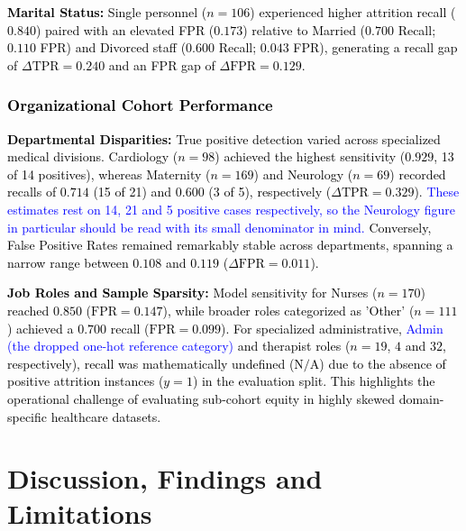 \documentclass[a4paper,fleqn]{cas-sc}
\begin{document}
\textcolor{black}{\textbf{Marital Status:} Single personnel ($n = 106$) experienced higher attrition recall ($0.840$) paired with an elevated FPR ($0.173$) relative to Married ($0.700$ Recall; $0.110$ FPR) and Divorced staff ($0.600$ Recall; $0.043$ FPR), generating a recall gap of $\Delta\text{TPR} = 0.240$ and an FPR gap of $\Delta\text{FPR} = 0.129$.}

\subsubsection*{\textcolor{black}{Organizational Cohort Performance}}
\textcolor{black}{\textbf{Departmental Disparities:} True positive detection varied across specialized medical divisions. Cardiology ($n = 98$) achieved the highest sensitivity ($0.929$, 13 of 14 positives), whereas Maternity ($n = 169$) and Neurology ($n = 69$) recorded recalls of $0.714$ (15 of 21) and $0.600$ (3 of 5), respectively ($\Delta\text{TPR} = 0.329$). \textcolor{blue}{These estimates rest on 14, 21 and 5 positive cases respectively, so the Neurology figure in particular should be read with its small denominator in mind.} Conversely, False Positive Rates remained remarkably stable across departments, spanning a narrow range between $0.108$ and $0.119$ ($\Delta\text{FPR} = 0.011$).}

\textcolor{black}{\textbf{Job Roles and Sample Sparsity:} Model sensitivity for Nurses ($n = 170$) reached $0.850$ ($\text{FPR} = 0.147$), while broader roles categorized as 'Other' ($n = 111$) achieved a $0.700$ recall ($\text{FPR} = 0.099$). For specialized administrative, \textcolor{blue}{Admin (the dropped one-hot reference category)} and therapist roles ($n = 19$, $4$ and $32$, respectively), recall was mathematically undefined ($\text{N/A}$) due to the absence of positive attrition instances ($y = 1$) in the evaluation split. This highlights the operational challenge of evaluating sub-cohort equity in highly skewed domain-specific healthcare datasets.}

\section{Discussion, Findings and Limitations}
\label{sec:disc}
\end{document}
